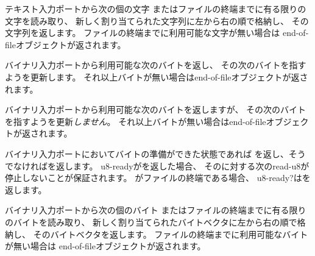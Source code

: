 \begin{entry}{%
}
\label{readstring}

テキスト入力ポートから次の個の文字
またはファイルの終端までに有る限りの文字を読み取り、
新しく割り当てられた文字列に左から右の順で格納し、
その文字列を返します。
ファイルの終端までに利用可能な文字が無い場合は
end-of-fileオブジェクトが返されます。

\end{entry}


\begin{entry}{%
}

バイナリ入力ポートから利用可能な次のバイトを返し、
その次のバイトを指すようを更新します。
それ以上バイトが無い場合はend-of-fileオブジェクトが返されます。

\end{entry}

\begin{entry}{%
}

バイナリ入力ポートから利用可能な次のバイトを返しますが、
その次のバイトを指すようを更新{\em しません}。
それ以上バイトが無い場合はend-of-fileオブジェクトが返されます。

\end{entry}

\begin{entry}{%
}


バイナリ入力ポートにおいてバイトの準備ができた状態であれば
\schtrue{}を返し、そうでなければ\schfalse{}を返します。
{\cf u8-ready}が\schtrue{}を返した場合、
そのに対する次の{\cf read-u8}が停止しないことが保証されます。
がファイルの終端である場合、
{\cf u8-ready?}は\schtrue{}を返します。

\end{entry}

\begin{entry}{%
}

バイナリ入力ポートから次の個のバイト
またはファイルの終端までに有る限りのバイトを読み取り、
新しく割り当てられたバイトベクタに左から右の順で格納し、
そのバイトベクタを返します。
ファイルの終端までに利用可能なバイトが無い場合は
end-of-fileオブジェクトが返されます。

\end{entry}

